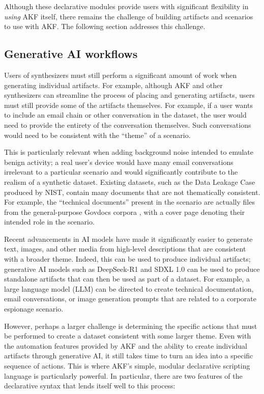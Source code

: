 \documentclass[final,5p,times,twocolumn]{elsarticle}
\begin{document}
Although these declarative modules provide users with significant
flexibility in \emph{using} AKF itself, there remains the challenge of
building artifacts and scenarios to use with AKF. The following section
addresses this challenge.

\subsection{Generative AI workflows}\label{generative-ai-workflows}

Users of synthesizers must still perform a significant amount of work
when generating individual artifacts. For example, although AKF and
other synthesizers can streamline the process of placing and generating
artifacts, users must still provide some of the artifacts themselves.
For example, if a user wants to include an email chain or other
conversation in the dataset, the user would need to provide the entirety
of the conversation themselves. Such conversations would need to be
consistent with the ``theme'' of a scenario.

This is particularly relevant when adding background noise intended to
emulate benign activity; a real user's device would have many email
conversations irrelevant to a particular scenario and would
significantly contribute to the realism of a synthetic dataset. Existing
datasets, such as the Data Leakage Case produced by NIST, contain many
documents that are not thematically consistent. For example, the
``technical documents'' present in the scenario are actually files from
the general-purpose Govdocs corpora
\citep{garfinkelBringingScienceDigital2009}, with a cover page
denoting their intended role in the scenario.

Recent advancements in AI models have made it significantly easier to
generate text, images, and other media from high-level descriptions that
are consistent with a broader theme. Indeed, this can be used to produce
individual artifacts; generative AI models such as DeepSeek-R1
\citep{deepseek-aiDeepSeekR1IncentivizingReasoning2025} and SDXL 1.0
\citep{podellSDXLImprovingLatent2023} can be used to produce
standalone artifacts that can then be used as part of a dataset. For
example, a large language model (LLM) can be directed to create
technical documentation, email conversations, or image generation
prompts that are related to a corporate espionage scenario.

However, perhaps a larger challenge is determining the specific actions
that must be performed to create a dataset consistent with some larger
theme. Even with the automation features provided by AKF and the ability
to create individual artifacts through generative AI, it still takes
time to turn an idea into a specific sequence of actions. This is where
AKF's simple, modular declarative scripting language is particularly
powerful. In particular, there are two features of the declarative
syntax that lends itself well to this process:
\end{document}
